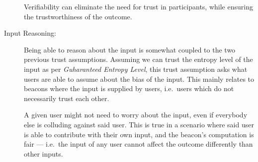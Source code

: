\begin{description}
        Verifiability can eliminate the need for trust in participants, while ensuring the trustworthiness of the outcome.

    \item [Input Reasoning:]
        Being able to reason about the input is somewhat coupled to the two previous trust assumptions.
        Assuming we can trust the entropy level of the input as per \emph{Guharanteed Entropy Level}, this trust assumption asks what users are able to assume about the bias of the input.
        This mainly relates to beacons where the input is supplied by users, i.e.\ users which do not necessarily trust each other.

        A given user might not need to worry about the input, even if everybody else is colluding against said user.
        This is true in a scenario where said user is able to contribute with their own input, and the beacon's computation is fair
        --- i.e.\ the input of any user cannot affect the outcome differently than other inputs.

\end{description}


